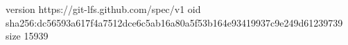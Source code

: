 version https://git-lfs.github.com/spec/v1
oid sha256:dc56593a617f4a7512dce6c5ab16a80a5f53b164e93419937c9e249d61239739
size 15939
